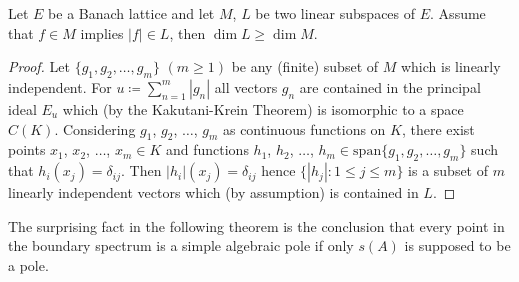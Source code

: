 \begin{lemma}\label{lem:c3-3.11}
	
	Let $E$ be a Banach lattice and let $M$, $L$ be two linear subspaces of $E$.
	Assume that $f \in M$ implies $|f| \in L$, then $\dim L \geq \dim M$.
\end{lemma}
\begin{proof}
    Let $\{g_{1},g_{2},\ldots,g_{m}\}$ $(m\geq 1)$ be any (finite) subset of $M$ which is linearly independent.
    For $u \coloneqq \sum_{n=1}^{m}|g_{n}|$ all vectors $g_{n}$ are contained in the principal ideal $E_{u}$ which (by the Kakutani-Krein Theorem) is isomorphic to a space $C(K)$.
    Considering $g_{1}$, $g_{2}$, $\ldots$, $g_{m}$ as continuous functions on $K$, there exist points $x_{1}$, $x_{2}$, $\ldots$, $x_{m} \in K$ and functions $h_{1}$, $h_{2}$, $\ldots$, $h_{m} \in \mathrm{span}\{g_{1},g_{2},\ldots,g_{m}\}$ such that $h_{i}(x_{j}) = \delta_{ij}$.
    Then $|h_{i}|(x_{j}) = \delta_{ij}$ hence $\{|h_{j}| \colon 1\leq j\leq m\}$
    is a subset of $m$ linearly independent vectors which (by assumption) is contained in $L$.
\end{proof}

The surprising fact in the following theorem is the conclusion that every point in the boundary spectrum is a simple algebraic pole if only $s(A)$ is supposed to be a pole.

